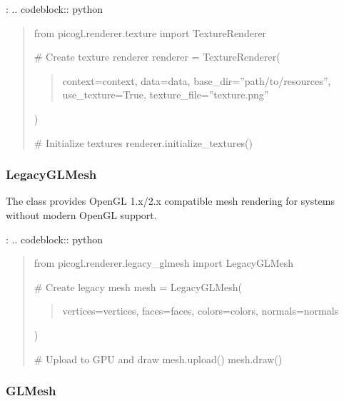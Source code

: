 \documentclass[a4paper,10pt,english,openany,oneside]{sphinxmanual}
\begin{document}
\sphinxAtStartPar
{}:
.. code\sphinxhyphen{}block:: python
\begin{quote}

\sphinxAtStartPar
from picogl.renderer.texture import TextureRenderer

\sphinxAtStartPar
\# Create texture renderer
renderer = TextureRenderer(
\begin{quote}

\sphinxAtStartPar
context=context,
data=data,
base\_dir=”path/to/resources”,
use\_texture=True,
texture\_file=”texture.png”
\end{quote}

\sphinxAtStartPar
)

\sphinxAtStartPar
\# Initialize textures
renderer.initialize\_textures()
\end{quote}


\subsubsection{LegacyGLMesh}
\label{\detokenize{api/renderer:legacyglmesh}}
\sphinxAtStartPar
The  class provides OpenGL 1.x/2.x compatible mesh rendering for systems without modern OpenGL support.

\sphinxAtStartPar
{}:
.. code\sphinxhyphen{}block:: python
\begin{quote}

\sphinxAtStartPar
from picogl.renderer.legacy\_glmesh import LegacyGLMesh

\sphinxAtStartPar
\# Create legacy mesh
mesh = LegacyGLMesh(
\begin{quote}

\sphinxAtStartPar
vertices=vertices,
faces=faces,
colors=colors,
normals=normals
\end{quote}

\sphinxAtStartPar
)

\sphinxAtStartPar
\# Upload to GPU and draw
mesh.upload()
mesh.draw()
\end{quote}


\subsubsection{GLMesh}
\label{\detokenize{api/renderer:glmesh}}
\end{document}
